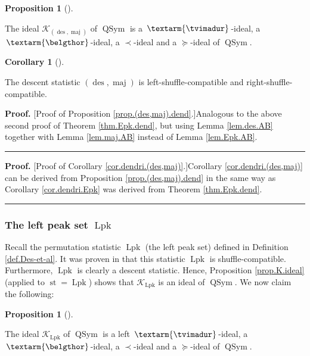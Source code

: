 \documentclass[numbers=enddot,12pt,final,onecolumn,notitlepage]{scrartcl}%
\theoremstyle{definition}
\newtheorem{prop}[theo]{Proposition}
\newenvironment{proposition}[1][]
{\begin{prop}[#1]\begin{leftbar}}
{\end{leftbar}\end{prop}}
\newtheorem{coro}[theo]{Corollary}
\newenvironment{corollary}[1][]
{\begin{coro}[#1]\begin{leftbar}}
{\end{leftbar}\end{coro}}
\newenvironment{proof}[1][Proof]{\noindent\textbf{#1.} }{\ \rule{0.5em}{0.5em}}
\newenvironment{verlong}{}{}
\newcommand{\tvi}{\left. \textarm{\tvimadur} \right.}
\newcommand{\bel}{\left. \textarm{\belgthor} \right.}
\begin{document}
\begin{verlong}
\begin{proposition}
\label{prop.(des,maj).dend}The ideal $\mathcal{K}_{\left(  \operatorname{des}%
,\operatorname*{maj}\right)  }$ of $\operatorname*{QSym}$ is a $\tvi$-ideal, a
$\bel$-ideal, a $\left.  \prec\right.  $-ideal and a $\left.  \succeq\right.
$-ideal of $\operatorname*{QSym}$.
\end{proposition}

\begin{corollary}
\label{cor.dendri.(des,maj)}The descent statistic $\left(  \operatorname{des}%
,\operatorname*{maj}\right)  $ is left-shuffle-compatible and right-shuffle-compatible.
\end{corollary}

\begin{proof}
[Proof of Proposition \ref{prop.(des,maj).dend}.]Analogous to the above second
proof of Theorem \ref{thm.Epk.dend}, but using Lemma \ref{lem.des.AB} together
with Lemma \ref{lem.maj.AB} instead of Lemma \ref{lem.Epk.AB}.
\end{proof}

\begin{proof}
[Proof of Corollary \ref{cor.dendri.(des,maj)}.]Corollary
\ref{cor.dendri.(des,maj)} can be derived from Proposition
\ref{prop.(des,maj).dend} in the same way as Corollary \ref{cor.dendri.Epk}
was derived from Theorem \ref{thm.Epk.dend}.
\end{proof}

\subsubsection{The left peak set $\operatorname*{Lpk}$}

Recall the permutation statistic $\operatorname*{Lpk}$ (the left peak set)
defined in Definition \ref{def.Des-et-al}. It was proven in \cite[Theorem 4.9
\textbf{(a)}]{part1} that this statistic $\operatorname*{Lpk}$ is
shuffle-compatible. Furthermore, $\operatorname*{Lpk}$ is clearly a descent
statistic. Hence, Proposition \ref{prop.K.ideal} (applied to
$\operatorname{st}=\operatorname*{Lpk}$) shows that $\mathcal{K}%
_{\operatorname*{Lpk}}$ is an ideal of $\operatorname*{QSym}$. We now claim
the following:

\begin{proposition}
\label{prop.Lpk.dend}The ideal $\mathcal{K}_{\operatorname*{Lpk}}$ of
$\operatorname*{QSym}$ is a left $\tvi$-ideal, a $\bel$-ideal, a $\left.
\prec\right.  $-ideal and a $\left.  \succeq\right.  $-ideal of
$\operatorname*{QSym}$.
\end{proposition}


\end{verlong}
\end{document}
